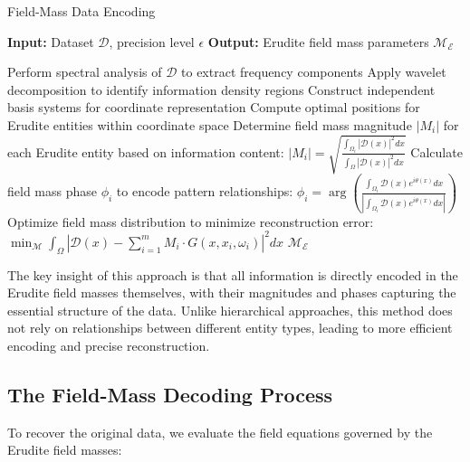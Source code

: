 \begin{algorithm}[h]
\caption{Field-Mass Data Encoding}
\begin{algorithmic}[1]
\State \textbf{Input:} Dataset $\mathcal{D}$, precision level $\epsilon$
\State \textbf{Output:} Erudite field mass parameters $\mathcal{M}_{\mathcal{E}}$

\State Perform spectral analysis of $\mathcal{D}$ to extract frequency components
\State Apply wavelet decomposition to identify information density regions
\State Construct independent basis systems for coordinate representation
\State Compute optimal positions for Erudite entities within coordinate space
\State Determine field mass magnitude $|M_i|$ for each Erudite entity based on information content:
\State \hspace{1em} $|M_i| = \sqrt{\frac{\int_{\Omega_i} |\mathcal{D}(x)|^2 dx}{\int_\Omega |\mathcal{D}(x)|^2 dx}}$
\State Calculate field mass phase $\phi_i$ to encode pattern relationships:
\State \hspace{1em} $\phi_i = \arg\left(\frac{\int_{\Omega_i} \mathcal{D}(x) e^{i\theta(x)} dx}{|\int_{\Omega_i} \mathcal{D}(x) e^{i\theta(x)} dx|}\right)$
\State Optimize field mass distribution to minimize reconstruction error:
\State \hspace{1em} $\min_{\mathcal{M}} \int_\Omega \left| \mathcal{D}(x) - \sum_{i=1}^m M_i \cdot G(x, x_i, \omega_i) \right|^2 dx$
\State \Return $\mathcal{M}_{\mathcal{E}}$
\end{algorithmic}
\end{algorithm}

The key insight of this approach is that all information is directly encoded in the Erudite field masses themselves, with their magnitudes and phases capturing the essential structure of the data. Unlike hierarchical approaches, this method does not rely on relationships between different entity types, leading to more efficient encoding and precise reconstruction.

\subsection{The Field-Mass Decoding Process}

To recover the original data, we evaluate the field equations governed by the Erudite field masses:


